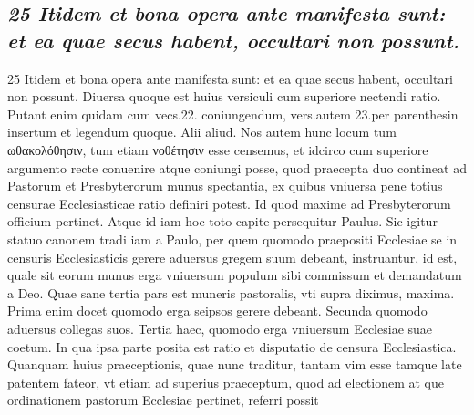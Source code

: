 \documentclass{article}
\begin{document}
\begin{pages}
\subsection*{\textit{25 Itidem et bona opera ante manifesta sunt: et ea quae secus habent, occultari non possunt.}}25 Itidem et bona opera ante manifesta sunt: et ea quae secus habent, occultari non possunt. Diuersa quoque est huius versiculi cum superiore nectendi ratio. Putant enim quidam cum vecs.22. coniungendum, vers.autem 23.per parenthesin insertum et legendum quoque. Alii aliud. Nos autem hunc locum tum ωθακολόθησιν, tum etiam νοθέτησιν esse censemus, et idcirco cum superiore argumento recte conuenire atque coniungi posse, quod praecepta duo contineat ad Pastorum et Presbyterorum munus spectantia, ex quibus vniuersa pene totius censurae Ecclesiasticae ratio definiri potest. Id quod maxime ad Presbyterorum officium pertinet. Atque id iam hoc toto capite persequitur Paulus. Sic igitur statuo canonem tradi iam a Paulo, per quem quomodo praepositi Ecclesiae se in censuris Ecclesiasticis gerere aduersus gregem suum debeant, instruantur, id est, quale sit eorum munus erga vniuersum populum sibi commissum et demandatum a Deo. Quae sane tertia pars est muneris pastoralis, vti supra diximus, maxima. Prima enim docet quomodo erga seipsos gerere debeant. Secunda quomodo aduersus collegas suos. Tertia haec, quomodo erga vniuersum Ecclesiae suae coetum. In qua ipsa parte posita est ratio et disputatio de censura Ecclesiastica. Quanquam huius praeceptionis, quae nunc traditur, tantam vim esse tamque late patentem fateor, vt etiam ad superius praeceptum, quod ad electionem at que ordinationem pastorum Ecclesiae pertinet, referri possit  \pend

\end{pages}
\end{document}
